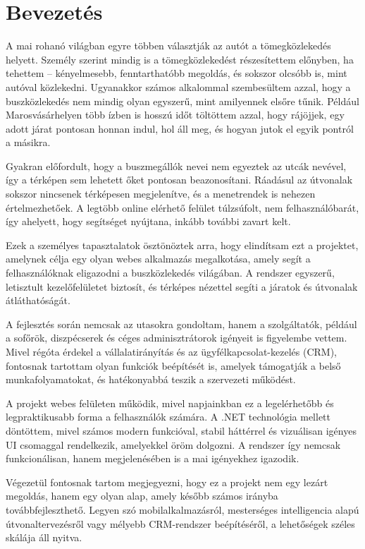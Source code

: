 \section{Bevezetés}

\indent A mai rohanó világban egyre többen választják az autót a tömegközlekedés helyett. Személy szerint mindig is a tömegközlekedést részesítettem előnyben, ha tehettem – kényelmesebb, fenntarthatóbb megoldás, és sokszor olcsóbb is, mint autóval közlekedni. Ugyanakkor számos alkalommal szembesültem azzal, hogy a buszközlekedés nem mindig olyan egyszerű, mint amilyennek elsőre tűnik. Például Marosvásárhelyen több ízben is hosszú időt töltöttem azzal, hogy rájöjjek, egy adott járat pontosan honnan indul, hol áll meg, és hogyan jutok el egyik pontról a másikra.

Gyakran előfordult, hogy a buszmegállók nevei nem egyeztek az utcák nevével, így a térképen sem lehetett őket pontosan beazonosítani. Ráadásul az útvonalak sokszor nincsenek térképesen megjelenítve, és a menetrendek is nehezen értelmezhetőek. A legtöbb online elérhető felület túlzsúfolt, nem felhasználóbarát, így ahelyett, hogy segítséget nyújtana, inkább további zavart kelt.

Ezek a személyes tapasztalatok ösztönöztek arra, hogy elindítsam ezt a projektet, amelynek célja egy olyan webes alkalmazás megalkotása, amely segít a felhasználóknak eligazodni a buszközlekedés világában. A rendszer egyszerű, letisztult kezelőfelületet biztosít, és térképes nézettel segíti a járatok és útvonalak átláthatóságát.

A fejlesztés során nemcsak az utasokra gondoltam, hanem a szolgáltatók, például a sofőrök, diszpécserek és céges adminisztrátorok igényeit is figyelembe vettem. Mivel régóta érdekel a vállalatirányítás és az ügyfélkapcsolat-kezelés (CRM), fontosnak tartottam olyan funkciók beépítését is, amelyek támogatják a belső munkafolyamatokat, és hatékonyabbá teszik a szervezeti működést.

A projekt webes felületen működik, mivel napjainkban ez a legelérhetőbb és legpraktikusabb forma a felhasználók számára. A .NET technológia mellett döntöttem, mivel számos modern funkcióval, stabil háttérrel és vizuálisan igényes UI csomaggal rendelkezik, amelyekkel öröm dolgozni. A rendszer így nemcsak funkcionálisan, hanem megjelenésében is a mai igényekhez igazodik.

Végezetül fontosnak tartom megjegyezni, hogy ez a projekt nem egy lezárt megoldás, hanem egy olyan alap, amely később számos irányba továbbfejleszthető. Legyen szó mobilalkalmazásról, mesterséges intelligencia alapú útvonaltervezésről vagy mélyebb CRM-rendszer beépítéséről, a lehetőségek széles skálája áll nyitva.

